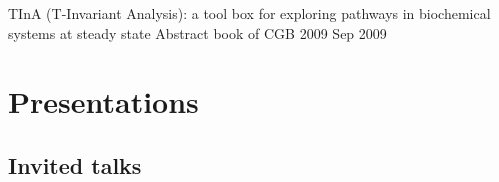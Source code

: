 \documentclass{klmr-cv}
\begin{document}
\begin{bibliography}
    {TInA (T-Invariant Analysis): a tool box for exploring pathways in
        biochemical systems at steady state}
    {Abstract book of CGB 2009}
    {Sep 2009}
    {}
\end{bibliography}

\section{Presentations}

\subsection{Invited talks}
\end{document}

